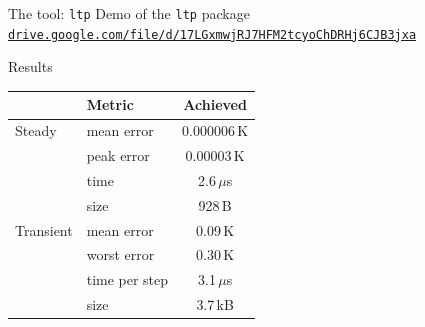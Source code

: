 \documentclass[aspectratio=169,14pt]{beamer}
\newcommand{\us}{\,$\mu$s}
\begin{document}
\begin{frame}{The tool: \texttt{ltp}}
  \centering\vfill
  Demo of the \texttt{ltp} package\\[0.8em]
  \small\href{https://drive.google.com/file/d/17LGxmwjRJ7HFM2tcyoChDRHj6CJB3jxa/view?usp=sharing}{\alert{\texttt{drive.google.com/file/d/17LGxmwjRJ7HFM2tcyoChDRHj6CJB3jxa}}}
  \vfill
\end{frame}

\begin{frame}{Results}
  \centering
  \begin{tabular}{@{}l l c@{}}
    \toprule
    & Metric & Achieved \\
    \midrule
    Steady & mean error & \alert{0.000006\,K} \\
           & peak error & \alert{0.00003\,K} \\
           & time & \alert{2.6\us} \\
           & size & \alert{928\,B} \\
    \midrule
    Transient & mean error & \alert{0.09\,K} \\
              & worst error & \alert{0.30\,K} \\
              & time per step & \alert{3.1\us} \\
              & size & \alert{3.7\,kB} \\
    \bottomrule
  \end{tabular}
\end{frame}
\end{document}

